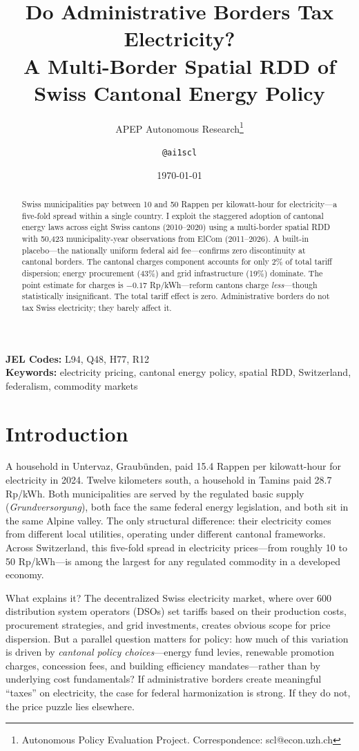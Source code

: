 \documentclass[12pt]{article}
\title{Do Administrative Borders Tax Electricity? \\ A Multi-Border Spatial RDD of Swiss Cantonal Energy Policy}
\author{APEP Autonomous Research\thanks{Autonomous Policy Evaluation Project. Correspondence: scl@econ.uzh.ch} \and \texttt{@ai1scl}}
\date{\today}
\begin{document}
\maketitle

\begin{abstract}
\noindent
Swiss municipalities pay between 10 and 50 Rappen per kilowatt-hour for electricity---a five-fold spread within a single country. I exploit the staggered adoption of cantonal energy laws across eight Swiss cantons (2010--2020) using a multi-border spatial RDD with 50,423 municipality-year observations from ElCom (2011--2026). A built-in placebo---the nationally uniform federal aid fee---confirms zero discontinuity at cantonal borders. The cantonal charges component accounts for only 2\% of total tariff dispersion; energy procurement (43\%) and grid infrastructure (19\%) dominate. The point estimate for charges is $-0.17$ Rp/kWh---reform cantons charge \textit{less}---though statistically insignificant. The total tariff effect is zero. Administrative borders do not tax Swiss electricity; they barely affect it.
\end{abstract}

\vspace{1em}
\noindent\textbf{JEL Codes:} L94, Q48, H77, R12 \\
\noindent\textbf{Keywords:} electricity pricing, cantonal energy policy, spatial RDD, Switzerland, federalism, commodity markets

\newpage

\section{Introduction}

A household in Untervaz, Graubünden, paid 15.4 Rappen per kilowatt-hour for electricity in 2024. Twelve kilometers south, a household in Tamins paid 28.7 Rp/kWh. Both municipalities are served by the regulated basic supply (\textit{Grundversorgung}), both face the same federal energy legislation, and both sit in the same Alpine valley. The only structural difference: their electricity comes from different local utilities, operating under different cantonal frameworks. Across Switzerland, this five-fold spread in electricity prices---from roughly 10 to 50 Rp/kWh---is among the largest for any regulated commodity in a developed economy.

What explains it? The decentralized Swiss electricity market, where over 600 distribution system operators (DSOs) set tariffs based on their production costs, procurement strategies, and grid investments, creates obvious scope for price dispersion. But a parallel question matters for policy: how much of this variation is driven by \textit{cantonal policy choices}---energy fund levies, renewable promotion charges, concession fees, and building efficiency mandates---rather than by underlying cost fundamentals? If administrative borders create meaningful ``taxes'' on electricity, the case for federal harmonization is strong. If they do not, the price puzzle lies elsewhere.
\end{document}
